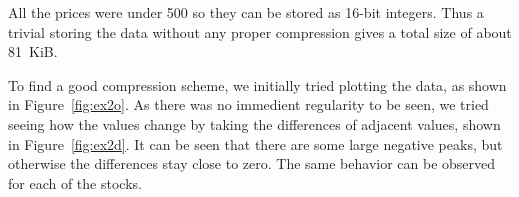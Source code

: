 \documentclass{article}
\begin{document}
All the prices were under 500 so they can be stored as 16-bit integers.
Thus a trivial storing the data without any proper compression gives a total size of about 81~KiB.

To find a good compression scheme, we initially tried plotting the data, as shown in Figure~\ref{fig:ex2o}.
As there was no immedient regularity to be seen, we tried seeing how the values change by taking the differences of adjacent values, shown in Figure~\ref{fig:ex2d}.
It can be seen that there are some large negative peaks, but otherwise the differences stay close to zero.
The same behavior can be observed for each of the stocks.

\begin{figure}

\end{figure}
\end{document}
